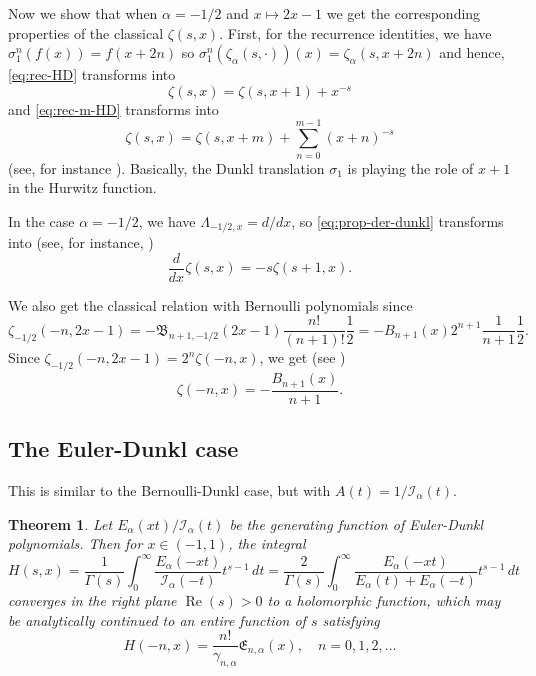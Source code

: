 \documentclass[a4paper]{amsart}
\newcommand{\I}{\mathcal{I}}
\newcommand{\Ea}{E_{\alpha}}
\newcommand{\B}{\mathfrak{B}}
\newcommand{\E}{\mathfrak{E}}
\renewcommand{\Re}{\operatorname{Re}}
\theoremstyle{plain}
\newtheorem{theorem}{Theorem}[section]
\theoremstyle{definition}
\theoremstyle{remark}
\numberwithin{equation}{section}
\begin{document}
Now we show that when $\alpha=-1/2$ and $x\mapsto 2x - 1$ we get the corresponding properties of the classical $\zeta(s,x)$. First, for the recurrence identities, we have $\sigma_1^n (f(x)) = f(x+2n)$ so $\sigma_1^n (\zeta_{\alpha}(s,\cdot))(x) = \zeta_{\alpha}(s,x+2n)$ and hence, \eqref{eq:rec-HD} transforms into 
\begin{equation*}
    \zeta(s,x) = \zeta(s,x+1) + x^{-s}
\end{equation*}
and \eqref{eq:rec-m-HD} transforms into
\begin{equation*}
    \zeta(s,x) = \zeta(s,x+m) + \sum_{n=0}^{m-1}(x+n)^{-s}
\end{equation*}
(see, for instance \cite[25.11.3 and 25.11.4]{OlMa-NIST}). Basically, the Dunkl translation $\sigma_1$ is playing the role of $x+1$ in the Hurwitz function.

In the case $\alpha=-1/2$, we have $\Lambda_{-1/2,x} = d/dx$, so \eqref{eq:prop-der-dunkl} transforms into (see, for instance, \cite[25.11.17]{OlMa-NIST})
\[
\frac{d}{dx}\zeta(s,x) = -s \zeta(s+1,x).
\]


We also get the classical relation with Bernoulli polynomials since
\begin{equation*}
\zeta_{-1/2}(-n,2x-1) = -\B_{n+1,-1/2}(2x-1)\frac{n!}{(n+1)!}\frac{1}{2} 
= -B_{n+1}(x)2^{n+1}\frac{1}{n+1}\frac{1}{2}.
\end{equation*}
Since $\zeta_{-1/2}(-n,2x-1)=2^{n}\zeta(-n,x)$, we get (see \cite[25.11.14]{OlMa-NIST})
\begin{equation}
\label{eq:bern-hurw}
    \zeta(-n,x) = -\frac{B_{n+1}(x)}{n+1}.
\end{equation}


\subsection{The Euler-Dunkl case}
\label{subsec:ED}

This is similar to the Bernoulli-Dunkl case, but with $A(t) = 1/\I_{\alpha}(t)$.

\begin{theorem}
\label{teo:mellinED}
Let $\Ea(xt)/\I_{\alpha}(t)$ be the generating function of Euler-Dunkl polynomials.
Then for $x \in (-1,1)$, the integral
\begin{equation*}
H(s,x) = \frac{1}{\Gamma(s)} 
\int_{0}^{\infty} \frac{\Ea(-xt)}{\I_{\alpha}(-t)} t^{s-1}\,dt
= \frac{2}{\Gamma(s)}
\int_{0}^{\infty} \frac{\Ea(-xt)}{\Ea(t)+\Ea(-t)} t^{s-1}\,dt
\end{equation*}
converges in the right plane $\Re(s) > 0$ to a holomorphic function, which may be analytically continued to an entire function of $s$ satisfying
\begin{equation*}
  H(-n,x) = \frac{n!}{\gamma_{n,\alpha}} \E_{n,\alpha}(x),\quad n=0,1,2,\dots
\end{equation*}
\end{theorem}
\end{document}
